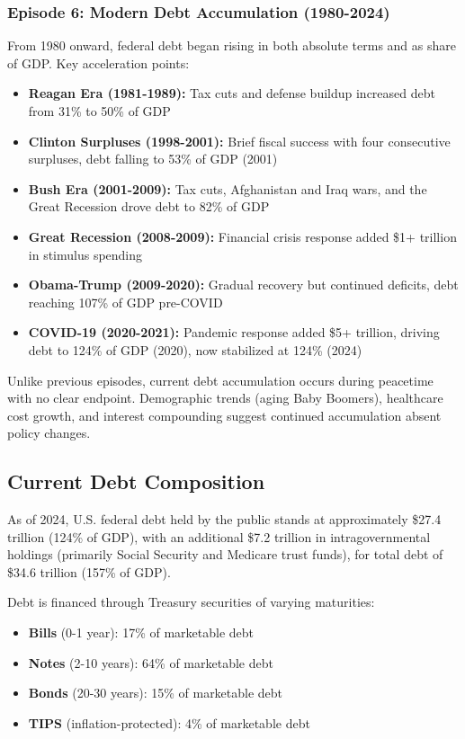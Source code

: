 \documentclass[12pt,letterpaper]{article}
\begin{document}
\subsubsection{Episode 6: Modern Debt Accumulation (1980-2024)}

From 1980 onward, federal debt began rising in both absolute terms and as share of GDP. Key acceleration points:

\begin{itemize}
    \item \textbf{Reagan Era (1981-1989):} Tax cuts and defense buildup increased debt from 31\% to 50\% of GDP
    \item \textbf{Clinton Surpluses (1998-2001):} Brief fiscal success with four consecutive surpluses, debt falling to 53\% of GDP (2001)
    \item \textbf{Bush Era (2001-2009):} Tax cuts, Afghanistan and Iraq wars, and the Great Recession drove debt to 82\% of GDP
    \item \textbf{Great Recession (2008-2009):} Financial crisis response added \$1+ trillion in stimulus spending
    \item \textbf{Obama-Trump (2009-2020):} Gradual recovery but continued deficits, debt reaching 107\% of GDP pre-COVID
    \item \textbf{COVID-19 (2020-2021):} Pandemic response added \$5+ trillion, driving debt to 124\% of GDP (2020), now stabilized at 124\% (2024)
\end{itemize}

Unlike previous episodes, current debt accumulation occurs during peacetime with no clear endpoint. Demographic trends (aging Baby Boomers), healthcare cost growth, and interest compounding suggest continued accumulation absent policy changes.

\subsection{Current Debt Composition}

As of 2024, U.S. federal debt held by the public stands at approximately \$27.4 trillion (124\% of GDP), with an additional \$7.2 trillion in intragovernmental holdings (primarily Social Security and Medicare trust funds), for total debt of \$34.6 trillion (157\% of GDP).

Debt is financed through Treasury securities of varying maturities:
\begin{itemize}
    \item \textbf{Bills} (0-1 year): 17\% of marketable debt
    \item \textbf{Notes} (2-10 years): 64\% of marketable debt
    \item \textbf{Bonds} (20-30 years): 15\% of marketable debt
    \item \textbf{TIPS} (inflation-protected): 4\% of marketable debt
\end{itemize}
\end{document}
